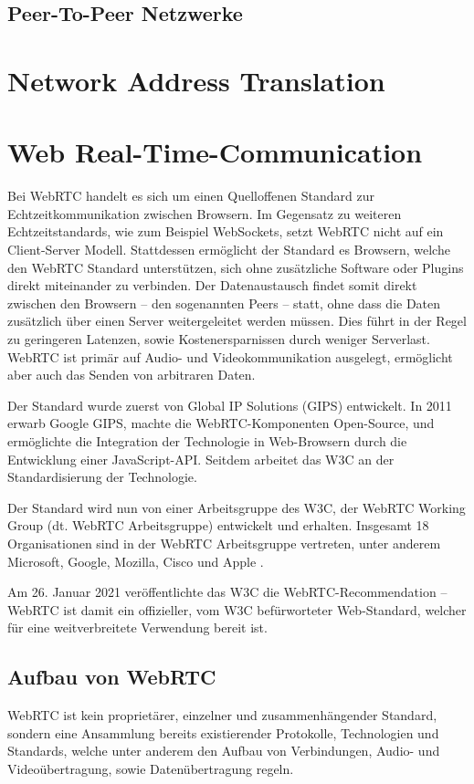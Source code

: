 \subsection{Peer-To-Peer Netzwerke}

\section{Network Address Translation}

\section{Web Real-Time-Communication}
Bei \ac{WebRTC} handelt es sich um einen Quelloffenen Standard zur Echtzeitkommunikation zwischen Browsern. Im Gegensatz zu weiteren Echtzeitstandards, wie zum Beispiel WebSockets, setzt \acs{WebRTC} nicht auf ein Client-Server Modell. Stattdessen ermöglicht der Standard es Browsern, welche den \acs{WebRTC} Standard unterstützen, sich ohne zusätzliche Software oder Plugins direkt miteinander zu verbinden. Der Datenaustausch findet somit direkt zwischen den Browsern -- den sogenannten Peers -- statt, ohne dass die Daten zusätzlich über einen Server weitergeleitet werden müssen. Dies führt in der Regel zu geringeren Latenzen, sowie Kostenersparnissen durch weniger Serverlast. WebRTC ist primär auf Audio- und Videokommunikation ausgelegt, ermöglicht aber auch das Senden von arbitraren Daten.\par

Der Standard wurde zuerst von Global IP Solutions (GIPS) entwickelt. In 2011 erwarb Google GIPS, machte die \acs{WebRTC}-Komponenten Open-Source, und ermöglichte die Integration der Technologie in Web-Browsern durch die Entwicklung einer JavaScript-\acs{API}. Seitdem arbeitet das \acs{W3C} an der Standardisierung der Technologie.

Der Standard wird nun von einer Arbeitsgruppe des \acs{W3C}, der \acs{WebRTC} Working Group (dt. WebRTC Arbeitsgruppe) entwickelt und erhalten. Insgesamt 18 Organisationen sind in der WebRTC Arbeitsgruppe vertreten, unter anderem Microsoft, Google, Mozilla, Cisco und Apple \cite{webRTCWorkingGroup}.\par

Am 26. Januar 2021 veröffentlichte das \acs{W3C} die \acs{WebRTC}-Recommendation -- \acs{WebRTC} ist damit ein offizieller, vom \acs{W3C} befürworteter Web-Standard, welcher für eine weitverbreitete Verwendung bereit ist. 

\subsection{Aufbau von WebRTC}
WebRTC ist kein proprietärer, einzelner und zusammenhängender Standard, sondern eine Ansammlung bereits existierender Protokolle, Technologien und Standards, welche unter anderem den Aufbau von Verbindungen, Audio- und Videoübertragung, sowie Datenübertragung regeln.\par

